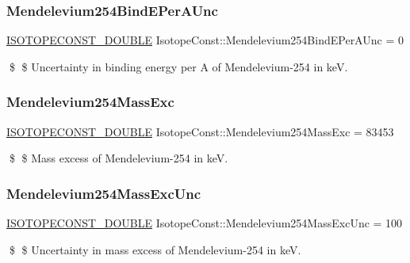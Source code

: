 \subsubsection{\texorpdfstring{Mendelevium254\+Bind\+E\+Per\+A\+Unc}{Mendelevium254BindEPerAUnc}}
{\footnotesize\ttfamily \mbox{\hyperlink{group___isotope_const-_macros_ga8f45a7272ce02c0b4c65c44636ed719a}{I\+S\+O\+T\+O\+P\+E\+C\+O\+N\+S\+T\+\_\+\+D\+O\+U\+B\+LE}} Isotope\+Const\+::\+Mendelevium254\+Bind\+E\+Per\+A\+Unc = 0}

\$ \$ Uncertainty in binding energy per A of Mendelevium-\/254 in keV. \mbox{\label{group___isotope_const-_mendelevium-_md254_gaad17d5f95da37dcaeb8776459a26a579}} 
\subsubsection{\texorpdfstring{Mendelevium254\+Mass\+Exc}{Mendelevium254MassExc}}
{\footnotesize\ttfamily \mbox{\hyperlink{group___isotope_const-_macros_ga8f45a7272ce02c0b4c65c44636ed719a}{I\+S\+O\+T\+O\+P\+E\+C\+O\+N\+S\+T\+\_\+\+D\+O\+U\+B\+LE}} Isotope\+Const\+::\+Mendelevium254\+Mass\+Exc = 83453}

\$ \$ Mass excess of Mendelevium-\/254 in keV. \mbox{\label{group___isotope_const-_mendelevium-_md254_gabacb928485914ce5a5ab00cecae67c43}} 
\subsubsection{\texorpdfstring{Mendelevium254\+Mass\+Exc\+Unc}{Mendelevium254MassExcUnc}}
{\footnotesize\ttfamily \mbox{\hyperlink{group___isotope_const-_macros_ga8f45a7272ce02c0b4c65c44636ed719a}{I\+S\+O\+T\+O\+P\+E\+C\+O\+N\+S\+T\+\_\+\+D\+O\+U\+B\+LE}} Isotope\+Const\+::\+Mendelevium254\+Mass\+Exc\+Unc = 100}

\$ \$ Uncertainty in mass excess of Mendelevium-\/254 in keV. \mbox{\label{group___isotope_const-_mendelevium-_md254_gacc06c7f91de9bdf8dbc102fff19da1bc}} 
